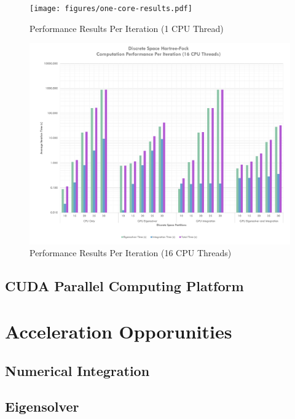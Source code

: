 \documentclass[journal, twoside]{IEEEtran}
\begin{document}
\begin{figure}[h]
\centering
\texttt{[image: figures/one-core-results.pdf]}
\caption{Performance Results Per Iteration (1 CPU Thread)}
\label{perf-results-per-iteration-one-core}
\end{figure}

\begin{figure}[h]
\centering
\includegraphics[width=7in]{figures/sixteen-core-results.pdf}
\caption{Performance Results Per Iteration (16 CPU Threads)}
\label{perf-results-per-iteration-sixteen-core}
\end{figure}

\subsection{CUDA Parallel Computing Platform}


\cite{nvidia-cuda}
\lipsum[4]

\section{Acceleration Opporunities}


\subsection{Numerical Integration}

\lipsum[4]

\subsection{Eigensolver}
\end{document}
